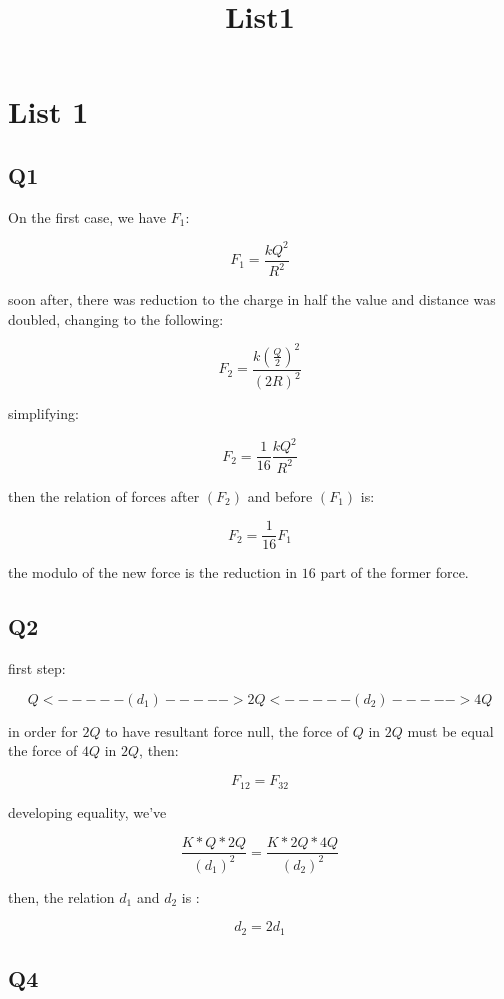 \documentclass[11pt]{article}
\title{List1}
\begin{document}
    
    \maketitle
    
    

    
    \hypertarget{list-1}{%
\section{List 1}\label{list-1}}

\hypertarget{q1}{%
\subsection{Q1}\label{q1}}

    On the first case, we have \(F_1\):

\[F_1 = \frac{k Q^2}{R^2}\]

    soon after, there was reduction to the charge in half the value and
distance was doubled, changing to the following:

\[ F_2 = \frac{k(\frac{Q}{2})^2}{(2R)^2} \]

    simplifying:

\[ F_2 = \frac{1}{16} \frac{kQ^2}{R^2} \]

    then the relation of forces after \((F_2)\) and before \((F_1)\) is:

\[ F_2 = \frac{1}{16} F_1 \]

    the modulo of the new force is the reduction in \(16\) part of the
former force.

    \hypertarget{q2}{%
\subsection{Q2}\label{q2}}

    first step:

\[ Q <-----(d_1)-----> 2Q <-----(d_2)-----> 4Q \]

    in order for \(2Q\) to have resultant force null, the force of \(Q\) in
\(2Q\) must be equal the force of \(4Q\) in \(2Q\), then:

\[F_{12} = F_{32}\]

    developing equality, we've

\[\frac{K*Q*2Q}{(d_1)^2} = \frac{K*2Q*4Q}{(d_2)^2}\]

    then, the relation \(d_1\) and \(d_2\) is :

\[ d_2 = 2d_1\]

    \hypertarget{q4}{%
\subsection{Q4}\label{q4}}
\end{document}
